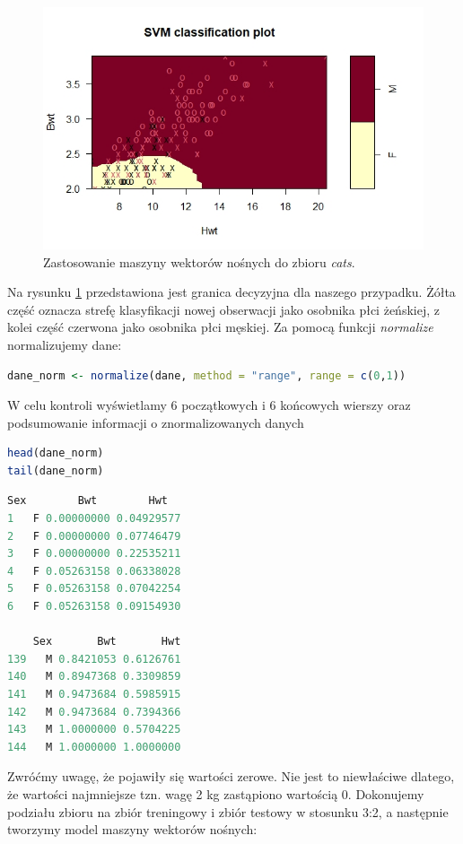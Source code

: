\documentclass[a4paper]{article}
\begin{document}
\begin{figure}[ht]
    \centering
    \includegraphics[width = \textwidth]{SVM.jpeg}
    \caption{Zastosowanie maszyny wektorów nośnych do zbioru \textit{cats}.}
    \label{r(2.11)}
\end{figure}
Na rysunku \ref{r(2.11)} przedstawiona jest granica decyzyjna dla naszego przypadku. Żółta część oznacza strefę klasyfikacji nowej obserwacji jako osobnika płci żeńskiej, z kolei część czerwona jako osobnika płci męskiej.\newpage
Za pomocą funkcji \textit{normalize} normalizujemy dane:
\begin{lstlisting}[language=R, frame=single]
dane_norm <- normalize(dane, method = "range", range = c(0,1))
\end{lstlisting}
W celu kontroli wyświetlamy 6 początkowych i 6 końcowych wierszy oraz podsumowanie informacji o znormalizowanych danych
\begin{lstlisting}[language=R, frame=single]
head(dane_norm)
tail(dane_norm)
\end{lstlisting}
\begin{lstlisting}[language=R, frame=single]
  Sex        Bwt        Hwt
1   F 0.00000000 0.04929577
2   F 0.00000000 0.07746479
3   F 0.00000000 0.22535211
4   F 0.05263158 0.06338028
5   F 0.05263158 0.07042254
6   F 0.05263158 0.09154930

    Sex       Bwt       Hwt
139   M 0.8421053 0.6126761
140   M 0.8947368 0.3309859
141   M 0.9473684 0.5985915
142   M 0.9473684 0.7394366
143   M 1.0000000 0.5704225
144   M 1.0000000 1.0000000
\end{lstlisting}
Zwróćmy uwagę, że pojawiły się wartości zerowe. Nie jest to niewłaściwe dlatego, że wartości najmniejsze tzn. wagę 2 kg zastąpiono wartością 0.
\newpage
Dokonujemy podziału zbioru na zbiór treningowy i zbiór testowy w stosunku 3:2, a następnie tworzymy model maszyny wektorów nośnych:
\end{document}
